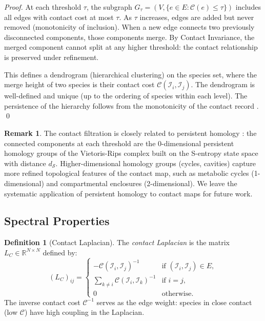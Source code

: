 \documentclass[11pt,twocolumn]{article}
\theoremstyle{plain}
\theoremstyle{definition}
\newtheorem{definition}[theorem]{Definition}
\newtheorem{remark}[theorem]{Remark}
\newcommand{\CC}{\mathcal{C}}
\newcommand{\dS}{d_{\mathcal{S}}}
\newcommand{\reals}{\mathbb{R}}
\begin{document}
\begin{proof}
At each threshold $\tau$, the subgraph $G_\tau = (V, \{e \in E : \CC(e) \leq
\tau\})$ includes all edges with contact cost at most $\tau$. As $\tau$
increases, edges are added but never removed (monotonicity of inclusion).
When a new edge connects two previously disconnected components, those
components merge. By Contact Invariance, the merged component cannot split at
any higher threshold: the contact relationship is preserved under refinement.

This defines a dendrogram (hierarchical clustering) on the species set, where
the merge height of two species is their contact cost $\CC(\mathcal{I}_i,
\mathcal{I}_j)$. The dendrogram is well-defined and unique (up to the ordering
of species within each level). The persistence of the hierarchy follows from
the monotonicity of the contact record \cite{edelsbrunner2008persistent,
ghrist2008barcodes, carlsson2009topology}. \qed
\end{proof}

\begin{remark}
The contact filtration is closely related to persistent homology
\cite{edelsbrunner2008persistent, carlsson2009topology}: the connected
components at each threshold are the 0-dimensional persistent homology groups
of the Vietoris-Rips complex built on the S-entropy state space with distance
$\dS$. Higher-dimensional homology groups (cycles, cavities) capture more
refined topological features of the contact map, such as metabolic cycles
(1-dimensional) and compartmental enclosures (2-dimensional). We leave the
systematic application of persistent homology to contact maps for future work.
\end{remark}

\subsection{Spectral Properties}

\begin{definition}[Contact Laplacian]
\label{def:laplacian}
The \emph{contact Laplacian} is the matrix $L_C \in \reals^{N \times N}$
defined by:
\begin{equation}\label{eq:laplacian}
  (L_C)_{ij} =
  \begin{cases}
    -\CC(\mathcal{I}_i, \mathcal{I}_j)^{-1}
      & \text{if } (\mathcal{I}_i, \mathcal{I}_j) \in E, \\
    \sum_{k \neq i} \CC(\mathcal{I}_i, \mathcal{I}_k)^{-1}
      & \text{if } i = j, \\
    0 & \text{otherwise}.
  \end{cases}
\end{equation}
The inverse contact cost $\CC^{-1}$ serves as the edge weight: species in close
contact (low $\CC$) have high coupling in the Laplacian.
\end{definition}
\end{document}
